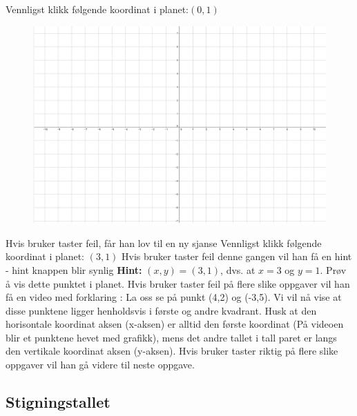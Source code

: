 \documentclass[12pt,twoside,onecolumn]{article}
\begin{document}
\begin{Exercise}
Vennligst klikk følgende koordinat i planet:$(0,1)$
\begin{figure}[h!]
\includegraphics[scale = 0.3]{figures/Grid.png}
\label{fig:grid}
\end{figure}
\newline
{\color{Maroon}Hvis bruker taster feil, får han lov til en ny sjanse}
\newline
Vennligst klikk følgende koordinat i planet: $(3,1)$
\newline
{\color{Maroon}Hvis bruker taster feil denne gangen vil han få en hint - hint knappen blir synlig}
\newline\newline
\textbf{Hint:}  $(x,y) = (3,1)$, dvs. at $x = 3$ og $y = 1$. Prøv å vis dette punktet i planet.
\newline
\newline
{\color{Maroon}Hvis bruker taster feil på flere slike oppgaver vil han få en video med forklaring :} 
\newline
La oss se på punkt (4,2) og (-3,5). Vi vil nå vise at disse punktene ligger henholdsvis i første og andre kvadrant.
Husk at den horisontale koordinat aksen (x-aksen) er alltid den første koordinat ({\color{PineGreen}På videoen blir et punktene hevet med grafikk}), mens det andre tallet i tall paret er langs den vertikale koordinat aksen (y-aksen).
\newline
\newline
{\color{Maroon}Hvis bruker taster riktig på flere slike oppgaver vil han gå videre til neste oppgave.}
\end{Exercise}


\subsection*{Stigningstallet}
\end{document}
